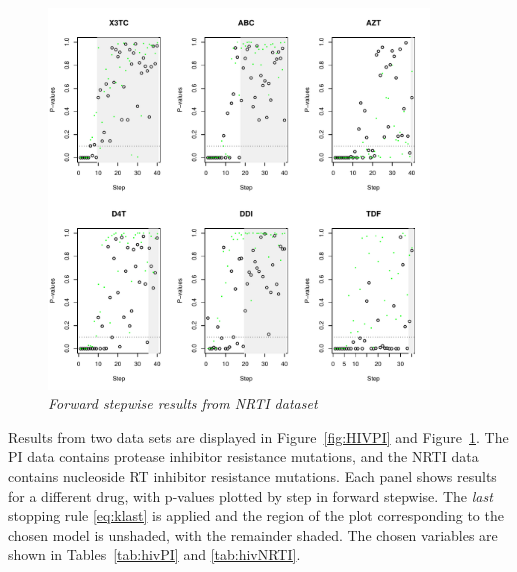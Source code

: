 \documentclass{imsart}
\begin{document}
\begin{figure}
\begin{center}
\includegraphics[width=0.9\textwidth]{../figs/HIV_NRTI.pdf}
\caption{\small \it Forward stepwise results from NRTI dataset}
\label{fig:HIVNRTI}
\end{center}
\end{figure}

Results from two data sets are displayed in Figure~\ref{fig:HIVPI} and
Figure~\ref{fig:HIVNRTI}. The PI data contains protease inhibitor
resistance mutations, and the NRTI data contains nucleoside RT inhibitor
resistance mutations.
Each panel shows results for a different drug,
with p-values plotted by step in forward stepwise. 
The \textit{last} stopping rule \eqref{eq:klast} is applied and the region of the plot
corresponding to the chosen model is unshaded, with the remainder shaded.
The chosen variables are shown in Tables~\ref{tab:hivPI} and
\ref{tab:hivNRTI}.




\end{document}
